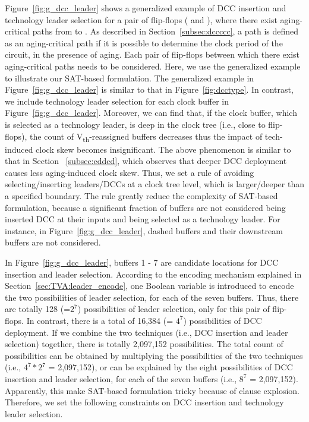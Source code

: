 Figure~\ref{fig:g_dcc_leader} shows a generalized example of DCC insertion and technology leader selection for a pair of flip-flops ( and ), where there exist aging-critical paths from  to . As described in Section~\ref{subsec:dccccc}, a path is defined as an aging-critical path if it is possible to determine the clock period of the circuit, in the presence of aging. Each pair of flip-flops between which there exist aging-critical paths needs to be considered. Here, we use the generalized example to illustrate our SAT-based formulation. The generalized example in Figure~\ref{fig:g_dcc_leader} is similar to that in Figure~\ref{fig:dcctype}. In contrast, we include technology leader selection for each clock buffer in Figure~\ref{fig:g_dcc_leader}. Moreover, we can find that, if the clock buffer, which is selected as a technology leader, is deep in the clock tree (i.e., close to flip-flops), the count of V\textsubscript{th}-reassigned buffers decreases thus the impact of tech-induced clock skew becomes insignificant. The above phenomenon is similar to that in Section ~\ref{subsec:eddcd}, which observes that deeper DCC deployment causes less aging-induced clock skew. Thus, we set a rule of avoiding selecting/inserting leaders/DCCs at a clock tree level, which is larger/deeper than a specified boundary.  The rule greatly reduce the complexity of SAT-based formulation, because a significant fraction of buffers are not considered being inserted DCC at their inputs and being selected as a technology leader. For instance, in Figure~\ref{fig:g_dcc_leader}, dashed buffers and their downstream buffers are not considered. 

In Figure~\ref{fig:g_dcc_leader}, buffers 1 - 7 are candidate locations for DCC insertion and leader selection. According to the encoding mechanism explained in Section~\ref{sec:TVA:leader_encode}, one Boolean variable is introduced to encode the two possibilities of leader selection, for each of the seven buffers. Thus, there are totally 128 (=$2^7$) possibilities of leader selection, only for this pair of flip-flops. In contrast, there is a total of 16,384 (= $4^7$) possibilities of DCC  deployment. If we combine the two techniques (i.e., DCC insertion and leader selection) together, there is totally 2,097,152 possibilities. The total count of possibilities can be obtained by multiplying the possibilities of the two techniques (i.e., $4^7*2^7$ = 2,097,152), or can be explained by the eight possibilities of DCC insertion and leader selection, for each of the seven buffers (i.e., $8^7$ = 2,097,152). Apparently, this make SAT-based formulation tricky because of clause explosion. Therefore, we set the following constraints on DCC insertion and technology leader selection.

